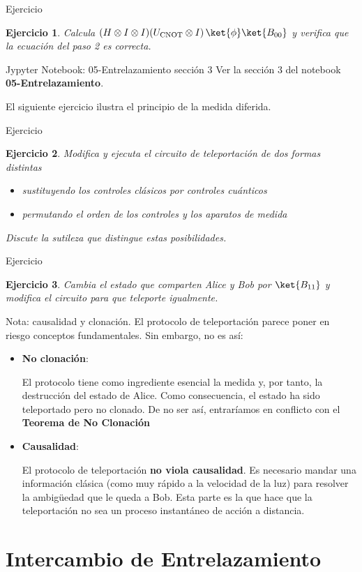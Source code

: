 \documentclass[a4paper,11pt]{book} %
\newtheorem{ejercicio_contador}{Ejercicio}
\newcommand{\Ejercicio}[1]{
		\begin{mybox_gray}{Ejercicio} 
			\begin{ejercicio_contador}
				 #1 
			\end{ejercicio_contador} 
		\end{mybox_gray}
	}
\numberwithin{equation}{chapter}
\begin{document}
	\Ejercicio{Calcula $(H \otimes I\otimes I)(U_{\rm CNOT}\otimes I)\, \ket{\phi}\ket{B_{00}}$ y verifica que la ecuación del paso 2 es correcta.}

	\begin{mybox_orange}{Jypyter Notebook: 05-Entrelazamiento sección 3}
	Ver la sección 3 del notebook \textbf{05-Entrelazamiento}.
	\end{mybox_orange}
	
El siguiente ejercicio ilustra el principio de la medida diferida.	
	
	\Ejercicio{Modifica y ejecuta  el circuito de teleportación de dos formas distintas
	\begin{itemize}
		\item[a)] sustituyendo los controles clásicos por controles cuánticos
		\item[b)] permutando el orden de los controles y los aparatos de medida
	\end{itemize}
	Discute la sutileza que distingue estas posibilidades. 
	}
	
	\Ejercicio{Cambia el estado que comparten Alice y Bob por $\ket{B_{11}}$ y modifica el circuito para que teleporte igualmente.}

	\begin{mybox_blue}{Nota: causalidad y clonación.}
	El protocolo de teleportación parece poner en riesgo conceptos fundamentales. Sin embargo,
	no es así:
	\begin{itemize}
		\item \textbf{No clonación}: 
		
		El protocolo tiene como ingrediente esencial la medida y, por tanto, la 
		destrucción del estado de Alice. Como consecuencia, el estado ha sido teleportado
		pero no clonado.  De no ser así, entraríamos en conflicto con el  
		\textbf{Teorema de No Clonación}
		
		\item \textbf{Causalidad}: 
		
		El protocolo de teleportación \textbf{no viola causalidad}. Es necesario mandar 
		una información clásica (como muy rápido a la velocidad de la luz) para resolver la
		ambigüedad que le queda a Bob. Esta parte es la que hace que la teleportación no sea
		un proceso instantáneo de acción a distancia.    
    
	\end{itemize}
	\end{mybox_blue}

    
    \section{Intercambio de Entrelazamiento}
\end{document}
